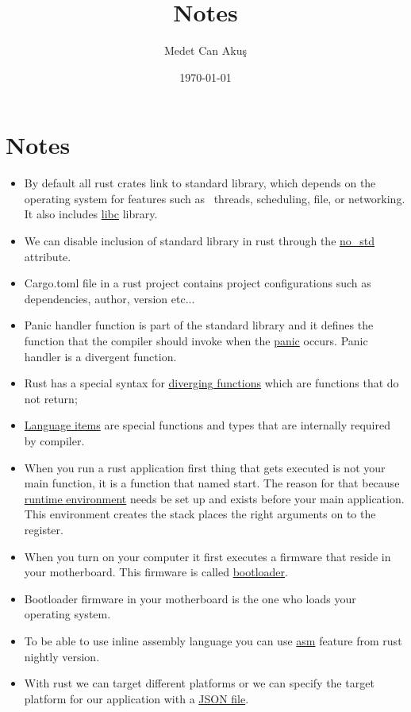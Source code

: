 \documentclass{article}
\title{Notes}
\author{Medet Can Akuş}
\date{\today}
\begin{document}
\tableofcontents
\maketitle
\section{Notes}
 \begin{itemize}
    \item By default all rust crates link to standard library, which depends on the operating system for features such as \
    threads, scheduling, file, or networking. It also includes \hyperlink{ref:libc}{libc} library. 
    \item We can disable inclusion of standard library in rust through the \hyperlink{ref:attribute}{no\_std} attribute.
    \item Cargo.toml file in a rust project contains project configurations such as dependencies, author, version etc...
    \item Panic handler function is part of the standard library and it defines the function that the compiler should invoke when the \hyperlink{ref:panic}{panic} occurs. Panic handler is a divergent function.
    \item Rust has a special syntax for \hyperlink{ref:diverging-function}{diverging functions} which are functions that do not return;
    \item \hyperlink{ref:language-item}{Language items} are special functions and types that are internally required by compiler.
    \item When you run a rust application first thing that gets executed is not your main function, it is a function that named start.
    The reason for that because \hyperlink{ref:runtime-environment}{runtime environment} needs be set up and exists before your main application. This environment creates the stack places the right arguments 
    on to the register.
    \item When you turn on your computer it first executes a firmware that reside in your motherboard. This firmware is called \hyperlink{ref:bootloader}{bootloader}.
    \item Bootloader firmware in your motherboard is the one who loads your operating system.
    \item To be able to use inline assembly language you can use \hyperlink{ref:asm}{asm} feature from rust nightly version.
    \item With rust we can target different platforms or we can specify the target platform for our application with a \hyperlink{ref:target-platform}{JSON file}.

\end{itemize}
\end{document}
